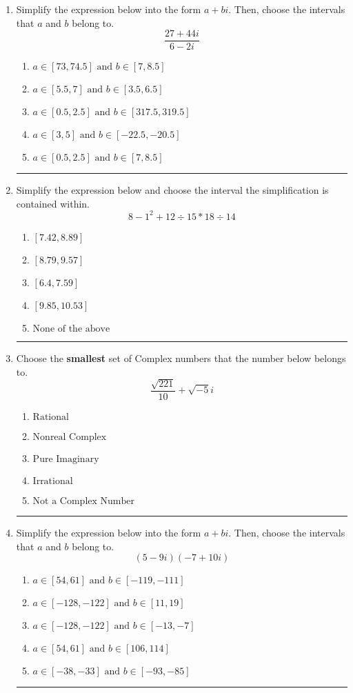 \documentclass[14pt]{extbook}
\newcommand{\litem}[1]{\item#1\hspace*{-1cm}\rule{\textwidth}{0.4pt}}
\begin{document}
\begin{enumerate}
{\begin{enumerate}[label=\Alph*.]
\end{enumerate} }
\litem{
Simplify the expression below into the form $a+bi$. Then, choose the intervals that $a$ and $b$ belong to.\[ \frac{27 + 44 i}{6 - 2 i} \]\begin{enumerate}[label=\Alph*.]
\item \( a \in [73, 74.5] \text{ and } b \in [7, 8.5] \)
\item \( a \in [5.5, 7] \text{ and } b \in [3.5, 6.5] \)
\item \( a \in [0.5, 2.5] \text{ and } b \in [317.5, 319.5] \)
\item \( a \in [3, 5] \text{ and } b \in [-22.5, -20.5] \)
\item \( a \in [0.5, 2.5] \text{ and } b \in [7, 8.5] \)

\end{enumerate} }
\litem{
Simplify the expression below and choose the interval the simplification is contained within.\[ 8 - 1^2 + 12 \div 15 * 18 \div 14 \]\begin{enumerate}[label=\Alph*.]
\item \( [7.42, 8.89] \)
\item \( [8.79, 9.57] \)
\item \( [6.4, 7.59] \)
\item \( [9.85, 10.53] \)
\item \( \text{None of the above} \)

\end{enumerate} }
\litem{
Choose the \textbf{smallest} set of Complex numbers that the number below belongs to.\[ \frac{\sqrt{221}}{10}+\sqrt{-5}i \]\begin{enumerate}[label=\Alph*.]
\item \( \text{Rational} \)
\item \( \text{Nonreal Complex} \)
\item \( \text{Pure Imaginary} \)
\item \( \text{Irrational} \)
\item \( \text{Not a Complex Number} \)

\end{enumerate} }
\litem{
Simplify the expression below into the form $a+bi$. Then, choose the intervals that $a$ and $b$ belong to.\[ (5 - 9 i)(-7 + 10 i) \]\begin{enumerate}[label=\Alph*.]
\item \( a \in [54, 61] \text{ and } b \in [-119, -111] \)
\item \( a \in [-128, -122] \text{ and } b \in [11, 19] \)
\item \( a \in [-128, -122] \text{ and } b \in [-13, -7] \)
\item \( a \in [54, 61] \text{ and } b \in [106, 114] \)
\item \( a \in [-38, -33] \text{ and } b \in [-93, -85] \)


\end{enumerate}}
\end{enumerate}
\end{document}
